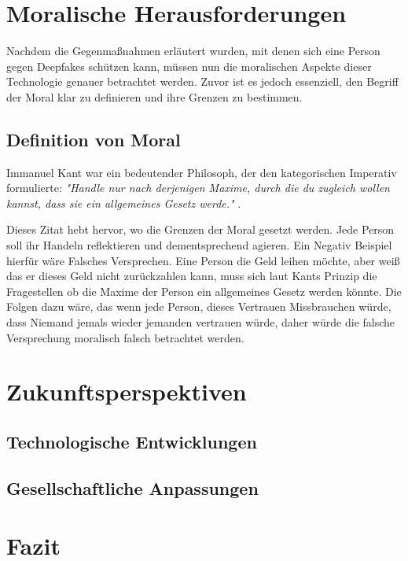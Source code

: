 \documentclass[a4paper,12pt]{article}
\begin{document}
\newpage

\section{Moralische Herausforderungen}
Nachdem die Gegenmaßnahmen erläutert wurden, mit denen sich eine Person gegen Deepfakes schützen kann, müssen nun die moralischen Aspekte dieser Technologie genauer betrachtet werden.
Zuvor ist es jedoch essenziell, den Begriff der Moral klar zu definieren und ihre Grenzen zu bestimmen.

\subsection{Definition von Moral}
Immanuel Kant war ein bedeutender Philosoph, der den kategorischen Imperativ formulierte:
\textit{"Handle nur nach derjenigen Maxime, durch die du zugleich wollen kannst, dass sie ein allgemeines Gesetz werde."} \cite{KantMetaphysik}.

Dieses Zitat hebt hervor, wo die Grenzen der Moral gesetzt werden. Jede Person soll ihr Handeln reflektieren und dementsprechend agieren.
Ein Negativ Beispiel hierfür wäre Falsches Versprechen. Eine Person die Geld leihen möchte, aber weiß das er dieses Geld nicht zurückzahlen kann, muss sich laut Kants Prinzip die Fragestellen ob die Maxime der Person ein allgemeines Gesetz werden könnte. Die Folgen dazu wäre, das wenn jede Person, dieses Vertrauen Missbrauchen würde, dass Niemand jemals wieder jemanden vertrauen würde, daher würde die falsche Versprechung moralisch falsch betrachtet werden. \cite{KantMetaphysik}

\newpage

\section{Zukunftsperspektiven}
\subsection{Technologische Entwicklungen}
\subsection{Gesellschaftliche Anpassungen}
\newpage

\section{Fazit}
\end{document}

